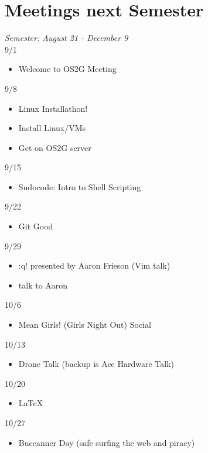 \section{Meetings next Semester}
\emph{Semester: August 21 - December 9} \\
9/1 \\
\begin{itemize}
    \item Welcome to OS2G Meeting
\end{itemize}
9/8 \\
\begin{itemize}
    \item Linux Installathon!
    \item Install Linux/VMs
    \item Get on OS2G server
\end{itemize}
9/15 \\
\begin{itemize}
    \item Sudocode: Intro to Shell Scripting
\end{itemize}
9/22 \\
\begin{itemize}
    \item Git Good
\end{itemize}
9/29 \\
\begin{itemize}
    \item :q! presented by Aaron Frieson (Vim talk)
    \item talk to Aaron
\end{itemize}
10/6 \\ 
\begin{itemize}
    \item Mean Girls! (Girls Night Out) Social
\end{itemize}
10/13 \\
\begin{itemize}
    \item Drone Talk (backup is Ace Hardware Talk)
\end{itemize}
10/20 \\
\begin{itemize}
    \item LaTeX
\end{itemize}
10/27 \\
\begin{itemize}
    \item Buccanner Day (safe surfing the web and piracy)
\end{itemize}
